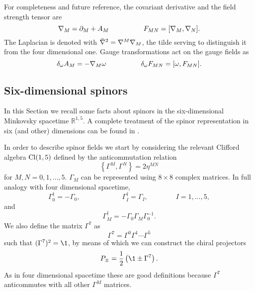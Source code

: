For completeness and future reference, the covariant derivative and the field strength tensor are 
\begin{equation}\label{6dim-covd-fmunu}
{ \mathcal{\nabla} }_M = \partial_M + A_M
\hspace{5em}
F_{MN} = [{ \mathcal{\nabla} }_M, { \mathcal{\nabla} }_N ].
\end{equation}
The Laplacian is denoted with $\tilde {{ \mathcal{\nabla} }}^2 = { \mathcal{\nabla} }^M { \mathcal{\nabla} }_M$, the tilde serving to distinguish it from the four dimensional one.
Gauge transformations act on the gauge fields as
\begin{equation}\label{6dim-covd-fmunu-gaugetrans}
\delta_\omega A_M = - { \mathcal{\nabla} }_M \omega
\hspace{5em}
\delta_\omega F_{MN} = [\omega, F_{MN}].
\end{equation}





\subsection{Six-dimensional spinors}



In this Section we recall some facts about spinors in the six-dimensional Minkovsky spacetime $\mathbb{R}^{1,5}$. A complete treatment of the spinor representation in six (and other) dimensions can be found in \cite{Kugo:1982bn,VanProeyen:1999ni}.


In order to describe spinor fields we start by considering the relevant Clifford algebra ${ \text{Cl} }(1,5)$ defined by the anticommutation relation
\begin{equation}
\left\{
\Gamma^M, \Gamma^{N}
\right\}
=
2 \eta^{MN} 
\end{equation}
for $M,N = 0,1,\ldots,5$. $\Gamma_M$ can be represented using $ 8 \times 8 $ complex matrices.
In full analogy with four dimensional spacetime, 
\begin{equation}
\Gamma^\dagger_0 = - \Gamma_0,
\qquad\qquad\qquad
\Gamma^\dagger_I = \Gamma_I,
\qquad\qquad
I = 1,\ldots,5,
\end{equation}
and
\begin{equation}
\Gamma_M^\dagger = - \Gamma_0 \Gamma_M \Gamma_0^{-1}.
\end{equation}
We also define the matrix $\Gamma^7$ as
\begin{equation}
\Gamma^7 = \Gamma^0 \Gamma^1 \cdots \Gamma^5
\end{equation}
such that \( (\Gamma^7)^2=\1\),
by means of which we can construct the chiral projectors
\begin{equation}
P_{\pm} = \frac{1}{2} \left( \1 \pm \Gamma^7  \right).
\end{equation}
As in four dimensional spacetime these are good definitions because $\Gamma^7$ anticommutes with all other $\Gamma^M$ matrices.

